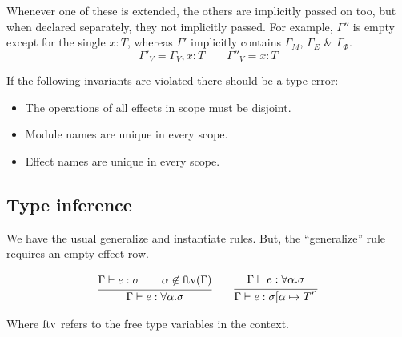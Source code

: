 Whenever one of these is extended, the others are implicitly passed on too, but when declared separately, they not implicitly passed. For example, $\Gamma''$ is empty except for the single $x: T$, whereas $\Gamma'$ implicitly contains $\Gamma_M$, $\Gamma_E$ \& $\Gamma_\Phi$.
\[ \Gamma'_V = \Gamma_V, x: T \qquad \Gamma''_V = x: T \]

If the following invariants are violated there should be a type error:

\begin{itemize}
    \item The operations of all effects in scope must be disjoint.
    \item Module names are unique in every scope.
    \item Effect names are unique in every scope.
\end{itemize}

\subsection{Type inference}

We have the usual generalize and instantiate rules. But, the ``generalize'' rule requires an empty effect row.


\begin{gather*}
    \infer{
        \Gamma \vdash e : \forall \alpha. \sigma
    }{
        \Gamma \vdash e : \sigma
        \qquad
        \alpha \not\in \ftv(\Gamma)
    }
    \qquad
    \infer{
        \Gamma \vdash e : \sigma[\alpha \mapsto T']
    }{
        \Gamma \vdash e : \forall \alpha. \sigma
    }
\end{gather*}

Where $\operatorname*{ftv}$ refers to the free type variables in the context.

